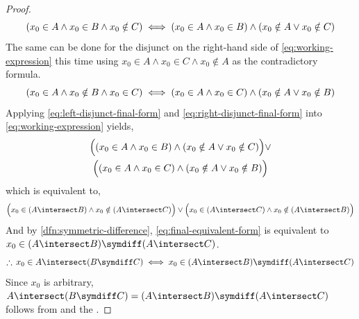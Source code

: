 \begin{proof}
\begin{equation}
        \label{eq:left-disjunct-final-form}
        \mleft( x_{0} \in A \land x_{0} \in B \land x_{0} \notin C \mright)
        \iff
        \mleft( x_{0} \in A \land x_{0} \in B \mright)
        \land
        \mleft( x_{0} \notin A \lor x_{0} \notin C \mright)
    \end{equation}
    The same can be done for the disjunct on the right-hand side of \eqref{eq:working-expression} this time using
    \( x_{0} \in A \land x_{0} \in C \land x_{0} \notin A\) as the contradictory formula.
    \begin{equation}
        \label{eq:right-disjunct-final-form}
        \mleft( x_{0} \in A \land x_{0} \notin B \land x_{0} \in C \mright)
        \iff
        \mleft( x_{0} \in A \land x_{0} \in C \mright)
        \land
        \mleft( x_{0} \notin A \lor x_{0} \notin B \mright)
    \end{equation}
    Applying \eqref{eq:left-disjunct-final-form} and \eqref{eq:right-disjunct-final-form} into
    \eqref{eq:working-expression} yields,
    \begin{multline*}
        \Big( \mleft( x_{0} \in A \land x_{0} \in B \mright)
        \land
        \mleft( x_{0} \notin A \lor x_{0} \notin C \mright)\Big)
        \lor \\
        \Big( \mleft( x_{0} \in A \land x_{0} \in C \mright)
        \land
        \mleft( x_{0} \notin A \lor x_{0} \notin B \mright)\Big)
    \end{multline*}
    which is equivalent to,
    \begin{equation}
        \label{eq:final-equivalent-form}
        \Big( x_{0} \in \mleft( A \intersect B \mright) \land x_{0} \notin \mleft( A \intersect C \mright)  \Big)
        \lor
        \Big( x_{0} \in \mleft( A \intersect C \mright) \land x_{0} \notin \mleft( A \intersect B \mright) \Big)
    \end{equation}
    And by \cref{dfn:symmetric-difference}, \eqref{eq:final-equivalent-form} is equivalent to
    \( x_{0} \in  \mleft( A \intersect B \mright) \symdiff \mleft( A \intersect C \mright) \).
    \begin{equation*}
        \therefore \, x_{0} \in A \intersect \mleft( B \symdiff C \mright)
        \iff
        x_{0} \in \mleft( A \intersect B \mright) \symdiff \mleft( A \intersect C \mright)
    \end{equation*}
    Since \( x_{0} \) is arbitrary,
    \( A \intersect \mleft( B \symdiff C \mright) = \mleft( A \intersect B \mright) \symdiff \mleft( A \intersect C \mright)\)
    follows from  and the .


\end{proof}
